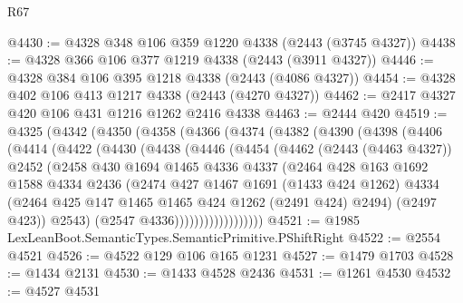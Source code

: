 \begin{lexlean}{R67}
\begin{coremodule}
@4430 := @4328 @348 @106 @359 @1220 @4338 (@2443 (@3745 @4327))
@4438 := @4328 @366 @106 @377 @1219 @4338 (@2443 (@3911 @4327))
@4446 := @4328 @384 @106 @395 @1218 @4338 (@2443 (@4086 @4327))
@4454 := @4328 @402 @106 @413 @1217 @4338 (@2443 (@4270 @4327))
@4462 := @2417 @4327 @420 @106 @431 @1216 @1262 @2416 @4338
@4463 := @2444 @420
@4519 := @4325
    (@4342
      (@4350
        (@4358
          (@4366
            (@4374
              (@4382
                (@4390
                  (@4398
                    (@4406
                      (@4414
                        (@4422
                          (@4430
                            (@4438
                              (@4446
                                (@4454
                                  (@4462
                                    (@2443 (@4463 @4327))
                                    @2452
                                    (@2458
                                      @430
                                      @1694
                                      @1465
                                      @4336
                                      @4337
                                      (@2464
                                        @428
                                        @163
                                        @1692
                                        @1588
                                        @4334
                                        @2436
                                        (@2474
                                          @427
                                          @1467
                                          @1691
                                          (@1433 @424 @1262)
                                          @4334
                                          (@2464
                                            @425
                                            @147
                                            @1465
                                            @1465
                                            @424
                                            @1262
                                            (@2491 @424)
                                            @2494)
                                          (@2497 @423))
                                        @2543)
                                      (@2547 @4336))))))))))))))))))
@4521 := @1985 LexLeanBoot.SemanticTypes.SemanticPrimitive.PShiftRight
@4522 := @2554 @4521
@4526 := @4522 @129 @106 @165 @1231
@4527 := @1479 @1703
@4528 := @1434 @2131
@4530 := @1433 @4528 @2436
@4531 := @1261 @4530
@4532 := @4527 @4531

\end{coremodule}
\end{lexlean}
